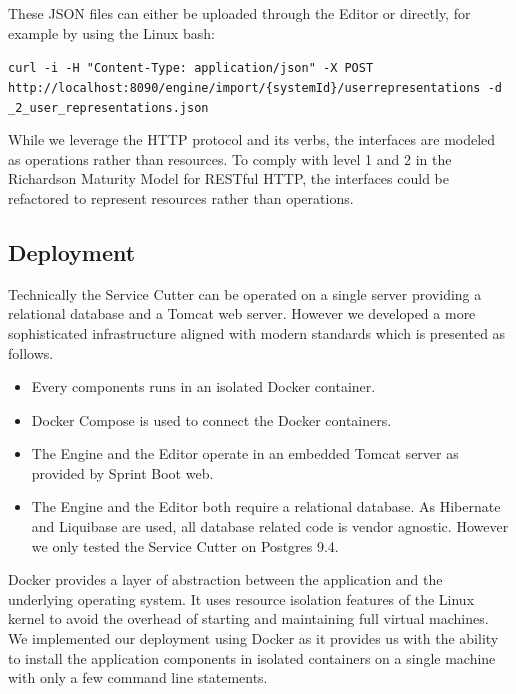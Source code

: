 These JSON files can either be uploaded through the Editor or directly, for example by using the Linux bash:

\texttt{curl -i -H "Content-Type: application/json" -X POST \newline http://localhost:8090/engine/import/\{systemId\}/userrepresentations -d \@booking\_2\_user\_representations.json}

While we leverage the HTTP protocol and its verbs, the interfaces are modeled as operations rather than resources. To comply with level 1 and 2 in the Richardson Maturity Model\cite{fowler2010richardson} for RESTful HTTP, the interfaces could be refactored to represent resources rather than operations. 

\subsection{Deployment}
\label{subsec:infrastructure}

Technically the Service Cutter can be operated on a single server providing a relational database and a Tomcat web server. However we developed a more sophisticated infrastructure aligned with modern standards which is presented as follows.

\begin{itemize}
\item Every components runs in an isolated Docker\cite{docker} container.
\item Docker Compose\cite{dockercompose} is used to connect the Docker containers.
\item The Engine and the Editor operate in an embedded Tomcat\cite{tomcat} server as provided by Sprint Boot web.
\item The Engine and the Editor both require a relational database. As Hibernate\cite{hibernate} and Liquibase\cite{liquibase} are used, all database related code is vendor agnostic. However we only tested the Service Cutter on Postgres 9.4\cite{postgres}.
\end{itemize}

Docker provides a layer of abstraction between the application and the underlying operating system. It uses resource isolation features of the Linux kernel to avoid the overhead of starting and maintaining full virtual machines. We implemented our deployment using Docker as it provides us with the ability to install the application components in isolated containers on a single machine with only a few command line statements.

